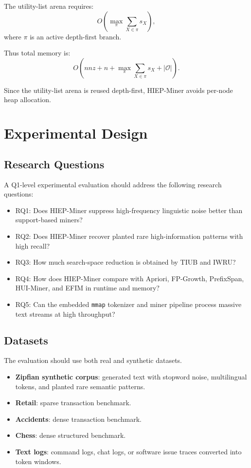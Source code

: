 \documentclass[11pt,a4paper]{article}
\newcommand{\Output}{\mathcal{O}}
\begin{document}
The utility-list arena requires:
\[
O\left(
\max_{\pi}
\sum_{X\in\pi}s_X
\right),
\]
where \(\pi\) is an active depth-first branch.

Thus total memory is:
\[
O\left(
nnz+n+
\max_{\pi}\sum_{X\in\pi}s_X
+
|\Output|
\right).
\]

Since the utility-list arena is reused depth-first, HIEP-Miner avoids per-node heap allocation.

\section{Experimental Design}

\subsection{Research Questions}

A Q1-level experimental evaluation should address the following research questions:

\begin{itemize}
    \item RQ1: Does HIEP-Miner suppress high-frequency linguistic noise better than support-based miners?
    \item RQ2: Does HIEP-Miner recover planted rare high-information patterns with high recall?
    \item RQ3: How much search-space reduction is obtained by TIUB and IWRU?
    \item RQ4: How does HIEP-Miner compare with Apriori, FP-Growth, PrefixSpan, HUI-Miner, and EFIM in runtime and memory?
    \item RQ5: Can the embedded \texttt{mmap} tokenizer and miner pipeline process massive text streams at high throughput?
\end{itemize}

\subsection{Datasets}

The evaluation should use both real and synthetic datasets.

\begin{itemize}
    \item \textbf{Zipfian synthetic corpus}: generated text with stopword noise, multilingual tokens, and planted rare semantic patterns.
    \item \textbf{Retail}: sparse transaction benchmark.
    \item \textbf{Accidents}: dense transaction benchmark.
    \item \textbf{Chess}: dense structured benchmark.
    \item \textbf{Text logs}: command logs, chat logs, or software issue traces converted into token windows.
\end{itemize}
\end{document}
